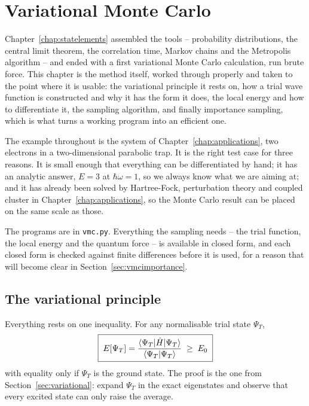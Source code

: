 \chapter{Variational Monte Carlo}
\label{chap:vmc}

Chapter~\ref{chap:statelements} assembled the tools -- probability
distributions, the central limit theorem, the correlation time, Markov chains
and the Metropolis algorithm -- and ended with a first variational Monte Carlo
calculation, run brute force.  This chapter is the method itself, worked
through properly and taken to the point where it is usable: the variational
principle it rests on, how a trial wave function is constructed and why it has
the form it does, the local energy and how to differentiate it, the sampling
algorithm, and finally importance sampling, which is what turns a working
program into an efficient one.

The example throughout is the system of Chapter~\ref{chap:applications}, two
electrons in a two-dimensional parabolic trap.  It is the right test case for
three reasons.  It is small enough that everything can be differentiated by
hand; it has an analytic answer, $E=3$ at $\hbar\omega=1$, so we always know
what we are aiming at; and it has already been solved by Hartree-Fock,
perturbation theory and coupled cluster in Chapter~\ref{chap:applications}, so
the Monte Carlo result can be placed on the same scale as those.

The programs are in \texttt{vmc.py}.  Everything the sampling needs -- the
trial function, the local energy and the quantum force -- is available in
closed form, and each closed form is checked against finite differences before
it is used, for a reason that will become clear in
Section~\ref{sec:vmcimportance}.

\section{The variational principle}
\label{sec:vmcprinciple}

Everything rests on one inequality.  For any normalisable trial state
$\Psi_T$,
\begin{equation}
  \boxed{\;
  E[\Psi_T]
   = \frac{\langle \Psi_T | \hat{H} | \Psi_T \rangle}{\langle \Psi_T \vert \Psi_T \rangle}
   \;\ge\; E_0 \;}
  \label{eq:13-variational}
\end{equation}
with equality only if $\Psi_T$ is the ground state.  The proof is the one from
Section~\ref{sec:variational}: expand $\Psi_T$ in the exact eigenstates and
observe that every excited state can only raise the average.


